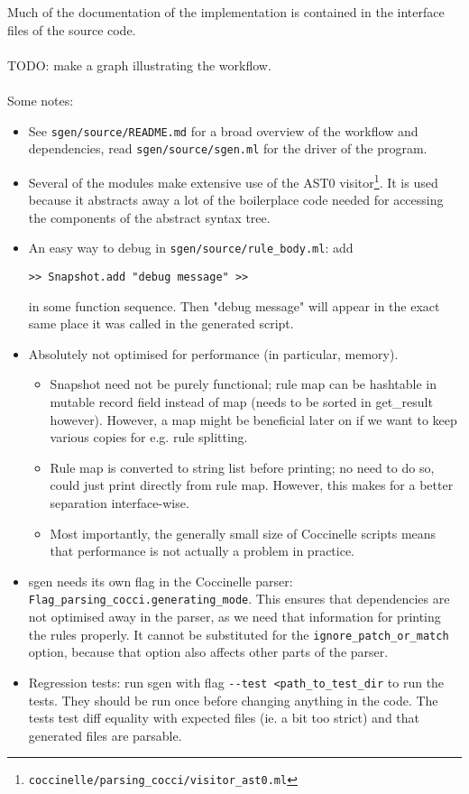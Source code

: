 Much of the documentation of the implementation is contained in the interface files of the source code.\\\\
TODO: make a graph illustrating the workflow.\\\\
Some notes:
\begin{itemize}
\item See \texttt{sgen/source/README.md} for a broad overview of the workflow and dependencies, read \texttt{sgen/source/sgen.ml} for the driver of the program.
\item Several of the modules make extensive use of the AST0 visitor\footnote{\texttt{coccinelle/parsing\_cocci/visitor\_ast0.ml}}. It is used because it abstracts away a lot of the boilerplace code needed for accessing the components of the abstract syntax tree.
\item An easy way to debug in \texttt{sgen/source/rule\_body.ml}: add
\begin{verbatim}
>> Snapshot.add "debug message" >>
\end{verbatim}
in some function sequence. Then "debug message" will appear in the exact same place it was called in the generated script.
\item Absolutely not optimised for performance (in particular, memory).
  \begin{itemize}
  \item Snapshot need not be purely functional; rule map can be hashtable in mutable record field instead of map (needs to be sorted in get\_result however). However, a map might be beneficial later on if we want to keep various copies for e.g. rule splitting.
  \item Rule map is converted to string list before printing; no need to do so, could just print directly from rule map. However, this makes for a better separation interface-wise.
  \item Most importantly, the generally small size of Coccinelle scripts means that performance is not actually a problem in practice.
  \end{itemize}
\item sgen needs its own flag in the Coccinelle parser: \texttt{Flag\_parsing\_cocci.generating\_mode}. This ensures that dependencies are not optimised away in the parser, as we need that information for printing the rules properly. It cannot be substituted for the \texttt{ignore\_patch\_or\_match} option, because that option also affects other parts of the parser.
\item Regression tests: run sgen with flag \texttt{-{}-test <path\_to\_test\_dir} to run the tests. They should be run once before changing anything in the code. The tests test diff equality with expected files (ie. a bit too strict) and that generated files are parsable.
\end{itemize}
